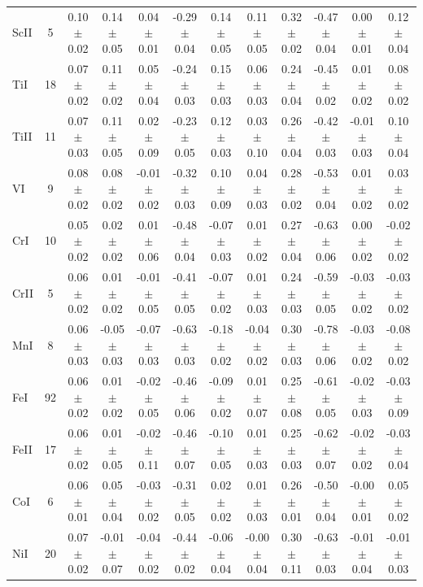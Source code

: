 \documentclass[oneside]{emulateapj}
\begin{document}
\begin{table}
\begin{tabular}{lccccccccccc}
ScII & 5 & 0.10 $\pm$ 0.02 & 0.14 $\pm$ 0.05 & 0.04 $\pm$ 0.01 & -0.29 $\pm$ 0.04 & 0.14 $\pm$ 0.05 & 0.11 $\pm$ 0.05 & 0.32 $\pm$ 0.02 & -0.47 $\pm$ 0.04 & 0.00 $\pm$ 0.01 & 0.12 $\pm$ 0.04 \\
TiI & 18 & 0.07 $\pm$ 0.02 & 0.11 $\pm$ 0.02 & 0.05 $\pm$ 0.04 & -0.24 $\pm$ 0.03 & 0.15 $\pm$ 0.03 & 0.06 $\pm$ 0.03 & 0.24 $\pm$ 0.04 & -0.45 $\pm$ 0.02 & 0.01 $\pm$ 0.02 & 0.08 $\pm$ 0.02 \\
TiII & 11 & 0.07 $\pm$ 0.03 & 0.11 $\pm$ 0.05 & 0.02 $\pm$ 0.09 & -0.23 $\pm$ 0.05 & 0.12 $\pm$ 0.03 & 0.03 $\pm$ 0.10 & 0.26 $\pm$ 0.04 & -0.42 $\pm$ 0.03 & -0.01 $\pm$ 0.03 & 0.10 $\pm$ 0.04 \\
VI & 9 & 0.08 $\pm$ 0.02 & 0.08 $\pm$ 0.02 & -0.01 $\pm$ 0.02 & -0.32 $\pm$ 0.03 & 0.10 $\pm$ 0.09 & 0.04 $\pm$ 0.03 & 0.28 $\pm$ 0.02 & -0.53 $\pm$ 0.04 & 0.01 $\pm$ 0.02 & 0.03 $\pm$ 0.02 \\
CrI & 10 & 0.05 $\pm$ 0.02 & 0.02 $\pm$ 0.02 & 0.01 $\pm$ 0.06 & -0.48 $\pm$ 0.04 & -0.07 $\pm$ 0.03 & 0.01 $\pm$ 0.02 & 0.27 $\pm$ 0.04 & -0.63 $\pm$ 0.06 & 0.00 $\pm$ 0.02 & -0.02 $\pm$ 0.02 \\
CrII & 5 & 0.06 $\pm$ 0.02 & 0.01 $\pm$ 0.02 & -0.01 $\pm$ 0.05 & -0.41 $\pm$ 0.05 & -0.07 $\pm$ 0.02 & 0.01 $\pm$ 0.03 & 0.24 $\pm$ 0.03 & -0.59 $\pm$ 0.05 & -0.03 $\pm$ 0.02 & -0.03 $\pm$ 0.02 \\
MnI & 8 & 0.06 $\pm$ 0.03 & -0.05 $\pm$ 0.03 & -0.07 $\pm$ 0.03 & -0.63 $\pm$ 0.03 & -0.18 $\pm$ 0.02 & -0.04 $\pm$ 0.02 & 0.30 $\pm$ 0.03 & -0.78 $\pm$ 0.06 & -0.03 $\pm$ 0.02 & -0.08 $\pm$ 0.02 \\
FeI & 92 & 0.06 $\pm$ 0.02 & 0.01 $\pm$ 0.02 & -0.02 $\pm$ 0.05 & -0.46 $\pm$ 0.06 & -0.09 $\pm$ 0.02 & 0.01 $\pm$ 0.07 & 0.25 $\pm$ 0.08 & -0.61 $\pm$ 0.05 & -0.02 $\pm$ 0.03 & -0.03 $\pm$ 0.09 \\
FeII & 17 & 0.06 $\pm$ 0.02 & 0.01 $\pm$ 0.05 & -0.02 $\pm$ 0.11 & -0.46 $\pm$ 0.07 & -0.10 $\pm$ 0.05 & 0.01 $\pm$ 0.03 & 0.25 $\pm$ 0.03 & -0.62 $\pm$ 0.07 & -0.02 $\pm$ 0.02 & -0.03 $\pm$ 0.04 \\
CoI & 6 & 0.06 $\pm$ 0.01 & 0.05 $\pm$ 0.04 & -0.03 $\pm$ 0.02 & -0.31 $\pm$ 0.05 & 0.02 $\pm$ 0.02 & 0.01 $\pm$ 0.03 & 0.26 $\pm$ 0.01 & -0.50 $\pm$ 0.04 & -0.00 $\pm$ 0.01 & 0.05 $\pm$ 0.02 \\
NiI & 20 & 0.07 $\pm$ 0.02 & -0.01 $\pm$ 0.07 & -0.04 $\pm$ 0.02 & -0.44 $\pm$ 0.02 & -0.06 $\pm$ 0.04 & -0.00 $\pm$ 0.04 & 0.30 $\pm$ 0.11 & -0.63 $\pm$ 0.03 & -0.01 $\pm$ 0.04 & -0.01 $\pm$ 0.03 \\

\end{tabular}
\end{table}
\end{document}
